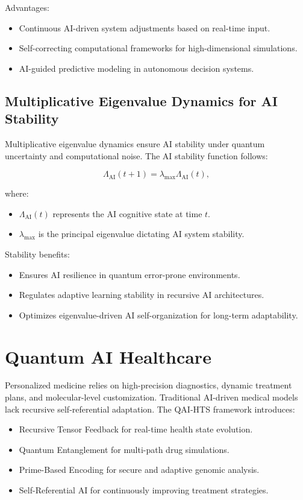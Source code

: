 \documentclass{article}
\theoremstyle{plain}
\begin{document}
\begin{itemize}
\begin{itemize}
Advantages:
\begin{itemize}
    \item Continuous AI-driven system adjustments based on real-time input.
    \item Self-correcting computational frameworks for high-dimensional simulations.
    \item AI-guided predictive modeling in autonomous decision systems.
\end{itemize}

\subsection{Multiplicative Eigenvalue Dynamics for AI Stability}

Multiplicative eigenvalue dynamics ensure AI stability under quantum uncertainty and computational noise. The AI stability function follows:

\begin{equation}
\Lambda_{\text{AI}}(t+1) = \lambda_{\text{max}} \Lambda_{\text{AI}}(t),
\end{equation}

where:
\begin{itemize}
    \item $\Lambda_{\text{AI}}(t)$ represents the AI cognitive state at time $t$.
    \item $\lambda_{\text{max}}$ is the principal eigenvalue dictating AI system stability.
\end{itemize}

Stability benefits:
\begin{itemize}
    \item Ensures AI resilience in quantum error-prone environments.
    \item Regulates adaptive learning stability in recursive AI architectures.
    \item Optimizes eigenvalue-driven AI self-organization for long-term adaptability.
\end{itemize}

\section{Quantum AI Healthcare}
Personalized medicine relies on high-precision diagnostics, dynamic treatment plans, and molecular-level customization. Traditional AI-driven medical models lack recursive self-referential adaptation. The QAI-HTS framework introduces:

\begin{itemize}
    \item Recursive Tensor Feedback for real-time health state evolution.
    \item Quantum Entanglement for multi-path drug simulations.
    \item Prime-Based Encoding for secure and adaptive genomic analysis.
    \item Self-Referential AI for continuously improving treatment strategies.
\end{itemize}


\end{itemize}
\end{itemize}
\end{document}
